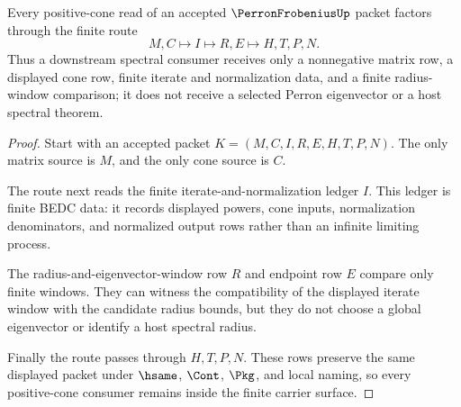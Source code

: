 \begin{theorem}
\label{thm:perron-frobenius-positive-cone-route}
Every positive-cone read of an accepted $\PerronFrobeniusUp$ packet factors through the finite route
$$
M,C \longmapsto I \longmapsto R,E \longmapsto H,T,P,N .
$$
Thus a downstream spectral consumer receives only a nonnegative matrix row, a displayed cone row, finite iterate and normalization data, and a finite radius-window comparison; it does not receive a selected Perron eigenvector or a host spectral theorem.
\end{theorem}
\begin{proof}
Start with an accepted packet $K=(M,C,I,R,E,H,T,P,N)$. The only matrix source is $M$, and the only cone source is $C$.

The route next reads the finite iterate-and-normalization ledger $I$. This ledger is finite BEDC data: it records displayed powers, cone inputs, normalization denominators, and normalized output rows rather than an infinite limiting process.

The radius-and-eigenvector-window row $R$ and endpoint row $E$ compare only finite windows. They can witness the compatibility of the displayed iterate window with the candidate radius bounds, but they do not choose a global eigenvector or identify a host spectral radius.

Finally the route passes through $H,T,P,N$. These rows preserve the same displayed packet under $\hsame$, $\Cont$, $\Pkg$, and local naming, so every positive-cone consumer remains inside the finite carrier surface.
\end{proof}




